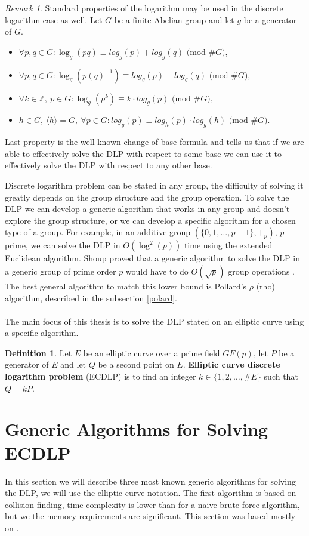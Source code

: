 \documentclass[thesis=M,english]{FITthesis}[2012/10/20]
\theoremstyle{remark}
\newtheorem*{RM}{Remark}
\theoremstyle{definition}
\newtheorem{DF}{Definition}[section]
\begin{document}
\begin{RM}
Standard properties of the logarithm may be used in the discrete logarithm case as well. Let $G$ be a finite Abelian group and let $g$ be a generator of $G$.
\begin{itemize}
\item $\forall p, q \in G: \log_g(pq) \equiv log_g(p) + log_g(q) \text{ (mod $\#G$)}$,
\item $\forall p, q \in G: \log_g(p(q)^{-1}) \equiv log_g(p) - log_g(q) \text{ (mod $\#G$)}$,
\item $\forall k \in \mathbb{Z},\ p \in G: \log_g(p^k) \equiv k \cdot log_g(p) \text{ (mod $\#G$)}$,
\item $h \in G,\ \langle h \rangle = G,\ \forall p \in G: log_g(p) \equiv log_h(p) \cdot log_g(h)  \text{ (mod $\#G$)}$.
\end{itemize}
Last property is the well-known change-of-base formula and tells us that if we are able to effectively solve the DLP with respect to some base we can use it to effectively solve the DLP with respect to any other base.
\end{RM}

\noindent Discrete logarithm problem can be stated in any group, the difficulty of solving it greatly depends on the group structure and the group operation. To solve the DLP we can develop a generic algorithm that works in any group and doesn't explore the group structure, or we can develop a specific algorithm for a chosen type of a group. For example, in an additive group $(\{0,1,\ldots, p-1\}, +_p)$, $p$ prime, we can solve the DLP in $O(\log^2(p))$ time using the extended Euclidean algorithm. Shoup proved that a generic algorithm to solve the DLP in a generic group of prime order $p$ would have to do $O(\sqrt{p})$ group operations \cite{shoup}. The best general algorithm to match this lower bound is Pollard's $\rho$ (rho) algorithm, described in the subsection \ref{polard}. 
\\
\\
\noindent The main focus of this thesis is to solve the DLP stated on an elliptic curve using a specific algorithm. 
\begin{DF}
Let $E$ be an elliptic curve over a prime field $GF(p)$, let $P$ be a generator of $E$ and let $Q$ be a second point on $E$. \textbf{Elliptic curve discrete logarithm problem} (ECDLP) is to find an integer $k \in \{1,2,\ldots	, \#E\}$ such that $Q = kP$.
\end{DF}
\section{Generic Algorithms for Solving ECDLP}
In this section we will describe three most known generic algorithms for solving the DLP, we will use the elliptic curve notation. The first algorithm is based on collision finding, time complexity is lower than for a naive brute-force algorithm, but we the memory requirements are significant. This section was based mostly on \cite{mky}.
\end{document}
